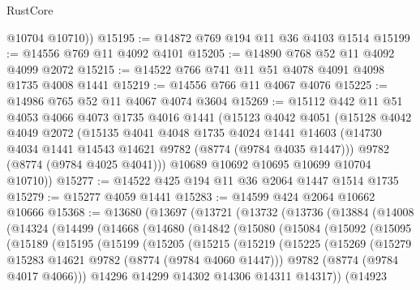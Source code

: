 \begin{lexlean}{RustCore}
\begin{coremodule}
        @10704
        @10710))
@15195 := @14872 @769 @194 @11 @36 @4103 @1514
@15199 := @14556 @769 @11 @4092 @4101
@15205 := @14890 @768 @52 @11 @4092 @4099 @2072
@15215 := @14522 @766 @741 @11 @51 @4078 @4091 @4098 @1735 @4008 @1441
@15219 := @14556 @766 @11 @4067 @4076
@15225 := @14986 @765 @52 @11 @4067 @4074 @3604
@15269 := @15112
    @442
    @11
    @51
    @4053
    @4066
    @4073
    @1735
    @4016
    @1441
    (@15123
      @4042
      @4051
      (@15128
        @4042
        @4049
        @2072
        (@15135
          @4041
          @4048
          @1735
          @4024
          @1441
          @14603
          (@14730 @4034 @1441 @14543 @14621 @9782 (@8774 (@9784 @4035 @1447)))
          @9782
          (@8774 (@9784 @4025 @4041)))
        @10689
        @10692
        @10695
        @10699
        @10704
        @10710))
@15277 := @14522 @425 @194 @11 @36 @2064 @1447 @1514 @1735
@15279 := @15277 @4059 @1441
@15283 := @14599 @424 @2064 @10662 @10666
@15368 := @13680
    (@13697
      (@13721
        (@13732
          (@13736
            (@13884
              (@14008
                (@14324
                  (@14499
                    (@14668
                      (@14680
                        (@14842
                          (@15080
                            (@15084
                              (@15092
                                (@15095
                                  (@15189
                                    (@15195
                                      (@15199
                                        (@15205
                                          (@15215
                                            (@15219
                                              (@15225
                                                (@15269
                                                  (@15279
                                                    @15283
                                                    @14621
                                                    @9782
                                                    (@8774 (@9784 @4060 @1447)))
                                                  @9782
                                                  (@8774 (@9784 @4017 @4066)))
                                                @14296
                                                @14299
                                                @14302
                                                @14306
                                                @14311
                                                @14317))
                                            (@14923

\end{coremodule}
\end{lexlean}

